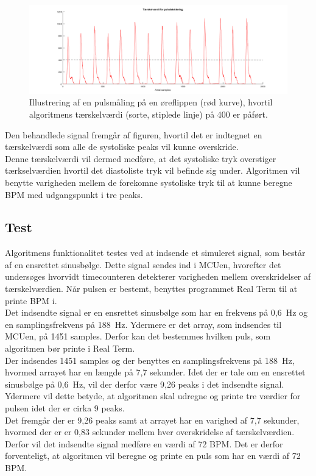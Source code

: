 \begin{figure}[H]
	\centering
	\includegraphics[scale=0.5]{figures/cDesign/puls_taerskel.png}
	\caption{Illustrering af en pulsmåling på en øreflippen (rød kurve), hvortil algoritmens tærskelværdi (sorte, stiplede linje) på 400 er påført.}
	\label{fig:taerskel_puls}
\end{figure}

Den behandlede signal fremgår af figuren, hvortil det er indtegnet en tærskelværdi som alle de systoliske peaks vil kunne overskride.\\
Denne tærskelværdi vil dermed medføre, at det systoliske tryk overstiger tærkselværdien hvortil det diastoliste tryk vil befinde sig under. Algoritmen vil benytte varigheden mellem de forekomne systoliske tryk til at kunne beregne BPM med udgangspunkt i tre peaks. 


\subsection{Test}
Algoritmens funktionalitet testes ved at indsende et simuleret signal, som består af en ensrettet sinusbølge. Dette signal sendes ind i MCUen, hvorefter det undersøges hvorvidt timecounteren detekterer varigheden mellem overskridelser af tærskelværdien. Når pulsen er bestemt, benyttes programmet Real Term til at printe BPM i. \\
Det indsendte signal er en ensrettet sinusbølge som har en frekvens på 0,6~Hz og en samplingsfrekvens på 188~Hz. Ydermere er det array, som indsendes til MCUen, på 1451 samples. Derfor kan det bestemmes hvilken puls, som algoritmen bør printe i Real Term. \\
Der indsendes 1451 samples og der benyttes en samplingsfrekvens på 188~Hz, hvormed arrayet har en længde på 7,7 sekunder. Idet der er tale om en ensrettet sinusbølge på 0,6~Hz, vil der derfor være 9,26 peaks i det indsendte signal. Ydermere vil dette betyde, at algoritmen skal udregne og printe tre værdier for pulsen idet der er cirka 9 peaks. \\
Det fremgår der er 9,26 peaks samt at arrayet har en varighed af 7,7 sekunder, hvormed der er er 0,83 sekunder mellem hver overskridelse af tærskelværdien. Derfor vil det indsendte signal medføre en værdi af 72 BPM. Det er derfor forventeligt, at algoritmen vil beregne og printe en puls som har en værdi af 72 BPM. 

